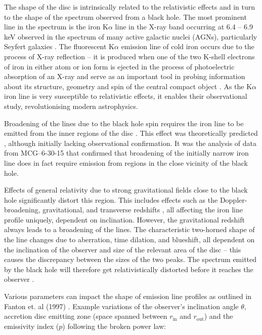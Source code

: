 \documentclass[fleqn,usenatbib,useAMS]{mnras}
\begin{document}
The shape of the disc is intrinsically related to the relativistic effects and in turn to the shape of the spectrum observed from a black hole. The most prominent line in the spectrum is the iron K$\alpha$ line in the X-ray band occurring at 6.4 -- 6.9 keV observed in the spectrum of many active galactic nuclei (AGNs), particularly Seyfert galaxies \cite{fabian2000broad}. The fluorescent K$\alpha$ emission line of cold iron occurs due to the process of X-ray reflection -- it is produced when one of the two K-shell electrons of iron in either atom or ion form is ejected in the process of photoelectric absorption of an X-ray \cite{fabian2000broad} and serve as an important tool in probing information about its structure, geometry and spin of the central compact object \cite{reynolds1999x}. As the K$\alpha$ iron line is very susceptible to relativistic effects, it enables their observational study, revolutionising modern astrophysics.

Broadening of the lines due to the black hole spin requires the iron line to be emitted from the inner regions of the disc \cite{laor2005line}. This effect was theoretically predicted \cite{stella1990measuring}, although initially lacking observational confirmation. It was the analysis of data from MCG--6-30-15 \cite{tanaka1995gravitationally} that confirmed that broadening of the initially narrow iron line does in fact require emission from regions in the close vicinity of the black hole.


Effects of general relativity due to strong gravitational fields close to the black hole significantly distort this region. This includes effects such as the Doppler-broadening, gravitational, and transverse redshifts \cite{fabian1989x}, all affecting the iron line profile uniquely, dependent on inclination. However, the gravitational redshift always leads to a broadening of the lines. The characteristic two-horned shape of the line changes due to aberration, time dilation, and blueshift, all dependent on the inclination of the observer and size of the relevant area of the disc -- this causes the discrepancy between the sizes of the two peaks. The spectrum emitted by the black hole will therefore get relativistically distorted before it reaches the observer \cite{dauser2016relativistic}. 

Various parameters can impact the shape of emission line profiles as outlined in Fanton et. al (1997) \cite{fanton1997detecting}. Example variations of the observer's inclination angle $\theta$, accretion disc emitting zone (space spanned between $r_{\text{in}}$ and $r_{\text{out}}$) and the emissivity index ($p$) following the broken power law:
\end{document}
